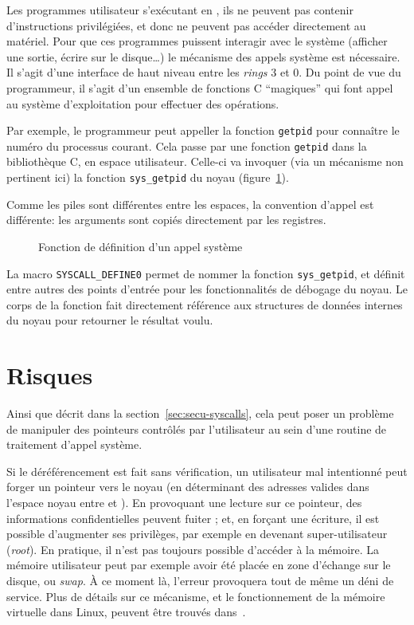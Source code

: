 \label{sec:impl-syscall}

Les programmes utilisateur s'exécutant en , ils ne peuvent pas contenir
d'instructions privilégiées, et donc ne peuvent pas accéder directement au
matériel. Pour que ces programmes puissent interagir avec le système (afficher
une sortie, écrire sur le disque…) le mécanisme des appels système est
nécessaire. Il s'agit d'une interface de haut niveau entre les \emph{rings} 3 et
0. Du point de vue du programmeur, il s'agit d'un ensemble de fonctions C
\enquote{magiques} qui font appel au système d'exploitation pour effectuer des
opérations.

Par exemple, le programmeur peut appeller la fonction \texttt{getpid} pour
connaître le numéro du processus courant. Cela passe par une fonction
\texttt{getpid} dans la bibliothèque C, en espace utilisateur. Celle-ci va
invoquer (via un mécanisme non pertinent ici) la fonction \texttt{sys\_getpid}
du noyau (figure~\ref{fig:syscall-def}).

Comme les piles sont différentes entre les espaces, la convention d'appel est
différente: les arguments sont copiés directement par les registres.

\begin{figure}[h]
    \caption{Fonction de définition d'un appel système}
    \label{fig:syscall-def}
\end{figure}

La macro \texttt{SYSCALL\_DEFINE0} permet de nommer la fonction
\texttt{sys\_getpid}, et définit entre autres des points d'entrée pour les
fonctionnalités de débogage du noyau. Le corps de la fonction fait directement
référence aux structures de données internes du noyau pour retourner le résultat
voulu.

\section{Risques}
\label{sec:risques-dos}

Ainsi que décrit dans la section~\ref{sec:secu-syscalls}, cela peut poser un
problème de manipuler des pointeurs contrôlés par l'utilisateur au sein d'une
routine de traitement d'appel système.

Si le déréférencement est fait sans vérification, un utilisateur mal intentionné
peut forger un pointeur vers le noyau (en déterminant des adresses valides dans
l'espace noyau entre  et ). En provoquant
une lecture sur ce pointeur, des informations confidentielles peuvent fuiter ;
et, en forçant une écriture, il est possible d'augmenter ses privilèges, par
exemple en devenant super-utilisateur (\emph{root}). En pratique, il n'est pas
toujours possible d'accéder à la mémoire. La mémoire utilisateur peut par
exemple avoir été placée en zone d'échange sur le disque, ou \emph{swap}. À ce
moment là, l'erreur provoquera tout de même un déni de service. Plus de détails
sur ce mécanisme, et le fonctionnement de la mémoire virtuelle dans Linux,
peuvent être trouvés dans~\cite{userspaceaccess}.


